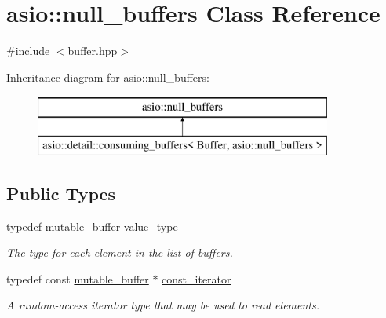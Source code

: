 \hypertarget{classasio_1_1null__buffers}{}\section{asio\+:\+:null\+\_\+buffers Class Reference}
\label{classasio_1_1null__buffers}


{\ttfamily \#include $<$buffer.\+hpp$>$}

Inheritance diagram for asio\+:\+:null\+\_\+buffers\+:\begin{figure}[H]
\begin{center}
\leavevmode
\includegraphics[height=2.000000cm]{classasio_1_1null__buffers}
\end{center}
\end{figure}
\subsection*{Public Types}
\begin{DoxyCompactItemize}
\item 
typedef \hyperlink{classasio_1_1mutable__buffer}{mutable\+\_\+buffer} \hyperlink{classasio_1_1null__buffers_a3178c4016392be035c13149433de3d68}{value\+\_\+type}
\begin{DoxyCompactList}\small\item\em The type for each element in the list of buffers. \end{DoxyCompactList}\item 
typedef const \hyperlink{classasio_1_1mutable__buffer}{mutable\+\_\+buffer} $\ast$ \hyperlink{classasio_1_1null__buffers_abdfa728f93ea0d07637fd1183be3be28}{const\+\_\+iterator}
\begin{DoxyCompactList}\small\item\em A random-\/access iterator type that may be used to read elements. \end{DoxyCompactList}\end{DoxyCompactItemize}
